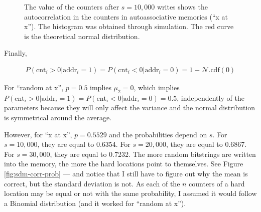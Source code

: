 \documentclass[12pt]{article}
\begin{document}
\begin{figure}[h!]
  \centering

  \caption{The value of the counters after $s=10,000$ writes shows the autocorrelation in the counters in autoassociative memories (``x at x''). The histogram was obtained through simulation. The red curve is the theoretical normal distribution.}
  \label{fig:sdm-corr-counters}
\end{figure}


Finally,

\begin{align}
P(\text{cnt}_i > 0 | \text{addr}_i = 1) = P(\text{cnt}_i < 0 | \text{addr}_i = 0) = 1 - \mathcal{N}.\text{cdf}(0)
\end{align}

For ``random at x'', $p=0.5$ implies $\mu_2 = 0$, which implies $P(\text{cnt}_i > 0 | \text{addr}_i = 1) = P(\text{cnt}_i < 0 | \text{addr}_i = 0) = 0.5$, independently of the parameters because they will only affect the variance and the normal distribution is symmetrical around the average.

However, for ``x at x'', $p=0.5529$ and the probabilities depend on $s$. For $s=10,000$, they are equal to 0.6354. For $s=20,000$, they are equal to 0.6867. For $s=30,000$, they are equal to 0.7232. The more random bitstrings are written into the memory, the more the hard locations point to themselves. See Figure \ref{fig:sdm-corr-prob} --- and notice that I still have to figure out why the mean is correct, but the standard deviation is not. As each of the $n$ counters of a hard location may be equal or not with the same probability, I assumed it would follow a Binomial distribution (and it worked for ``random at x'').
\end{document}

